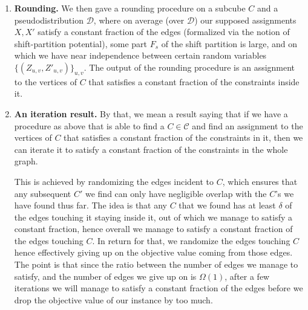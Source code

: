 \documentclass[11pt]{article}
\def \cD {\mathcal{D}}
\theoremstyle{definition}
\begin{document}
\begin{enumerate}
    To circumvent this, we showed that: 
    \begin{enumerate}
        \item \textbf{Eliminating global correlations:} using conditioning (as in~\cite{RT12}) we are able to make sure that the two collection 
    of random variables $\{Z_{u,v}\}_{u,v\in C}, \{Z'_{u,v}\}_{u,v\in C}$ of interest 
    (that are concerned with local information about the assignments $X$ and $X'$ on vertices $u,v$) are roughly
    pairwise independent.
        \item \textbf{Conditioning mostly preserves independence:} As the probability of the event that
        $C$ becomes dense in $F_s$ is noticeable, and $\{Z_{u,v}\}_{u,v\in C}$,$\{Z'_{u,v}\}_{u,v\in C}$ were pairwise-independent to begin with, we argue 
        that it cannot create too many dependencies between
        $(Z_{u,v}, Z'_{u,v})$.
    \end{enumerate} 
    
    \item \textbf{Rounding.} We then gave a rounding procedure on a subcube $C$ and a pseudodistribution $\cD$, where on average (over $\cD$) our supposed assignments $X,X'$ satisfy a constant fraction of the edges (formalized via the notion of
    shift-partition potential), some part $F_s$ of the shift partition is large, and on which we have near 
    independence between certain random variables 
    $\{(Z_{u,v},Z'_{u,v})\}_{u,v}$. The output of the rounding procedure is an assignment to the vertices of $C$ that satisfies a constant fraction of the constraints inside it.
    
    \item \textbf{An iteration result.} By that, we mean a result saying that if we have a procedure as above that is able to find a $C\in\mathcal{C}$ and find an assignment to the vertices of $C$ that satisfies a constant fraction of the constraints in it, then we can iterate it to satisfy a constant fraction 
    of the constraints in the whole graph. 
    
    This is achieved by randomizing the edges incident to $C$, which ensures that any subsequent $C'$ we find can only have negligible overlap with the $C$'s we have found thus far.
    The idea is that any $C$ that we found has at least 
    $\delta$ of the edges touching it staying inside it, 
    out of which we manage to satisfy a constant fraction, 
    hence overall we manage to satisfy a constant fraction
    of the edges touching $C$. In return for that, 
    we randomize the edges touching $C$ hence effectively giving up on the objective value coming from those edges. The point is that since the ratio between the number of edges we manage to satisfy, and the number of edges we give up on is $\Omega(1)$, after a few iterations we will manage to satisfy a 
    constant fraction of the edges before we drop the objective value of our instance by too much.
\end{enumerate}
\end{document}
